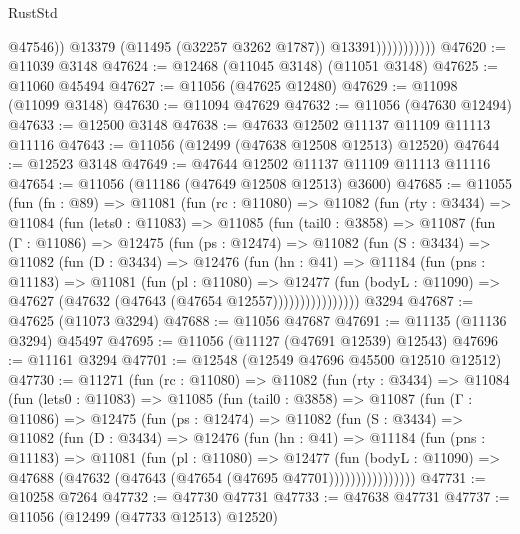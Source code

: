 \begin{lexlean}{RustStd}
\begin{coremodule}
                              @47546))
                          @13379
                          (@11495 (@32257 @3262 @1787))
                          @13391)))))))))))
@47620 := @11039 @3148
@47624 := @12468 (@11045 @3148) (@11051 @3148)
@47625 := @11060 @45494
@47627 := @11056 (@47625 @12480)
@47629 := @11098 (@11099 @3148)
@47630 := @11094 @47629
@47632 := @11056 (@47630 @12494)
@47633 := @12500 @3148
@47638 := @47633 @12502 @11137 @11109 @11113 @11116
@47643 := @11056 (@12499 (@47638 @12508 @12513) @12520)
@47644 := @12523 @3148
@47649 := @47644 @12502 @11137 @11109 @11113 @11116
@47654 := @11056 (@11186 (@47649 @12508 @12513) @3600)
@47685 := @11055
    (fun (fn : @89) =>
    @11081
      (fun (rc : @11080) =>
      @11082
        (fun (rty : @3434) =>
        @11084
          (fun (lets0 : @11083) =>
          @11085
            (fun (tail0 : @3858) =>
            @11087
              (fun (Γ : @11086) =>
              @12475
                (fun (ps : @12474) =>
                @11082
                  (fun (S : @3434) =>
                  @11082
                    (fun (D : @3434) =>
                    @12476
                      (fun (hn : @41) =>
                      @11184
                        (fun (pns : @11183) =>
                        @11081
                          (fun (pl : @11080) =>
                          @12477
                            (fun (bodyL : @11090) =>
                            @47627 (@47632 (@47643 (@47654 @12557))))))))))))))))
    @3294
@47687 := @47625 (@11073 @3294)
@47688 := @11056 @47687
@47691 := @11135 (@11136 @3294) @45497
@47695 := @11056 (@11127 (@47691 @12539) @12543)
@47696 := @11161 @3294
@47701 := @12548 (@12549 @47696 @45500 @12510 @12512)
@47730 := @11271
    (fun (rc : @11080) =>
    @11082
      (fun (rty : @3434) =>
      @11084
        (fun (lets0 : @11083) =>
        @11085
          (fun (tail0 : @3858) =>
          @11087
            (fun (Γ : @11086) =>
            @12475
              (fun (ps : @12474) =>
              @11082
                (fun (S : @3434) =>
                @11082
                  (fun (D : @3434) =>
                  @12476
                    (fun (hn : @41) =>
                    @11184
                      (fun (pns : @11183) =>
                      @11081
                        (fun (pl : @11080) =>
                        @12477
                          (fun (bodyL : @11090) =>
                          @47688 (@47632 (@47643 (@47654 (@47695 @47701))))))))))))))))
@47731 := @10258 @7264
@47732 := @47730 @47731
@47733 := @47638 @47731
@47737 := @11056 (@12499 (@47733 @12513) @12520)

\end{coremodule}
\end{lexlean}
